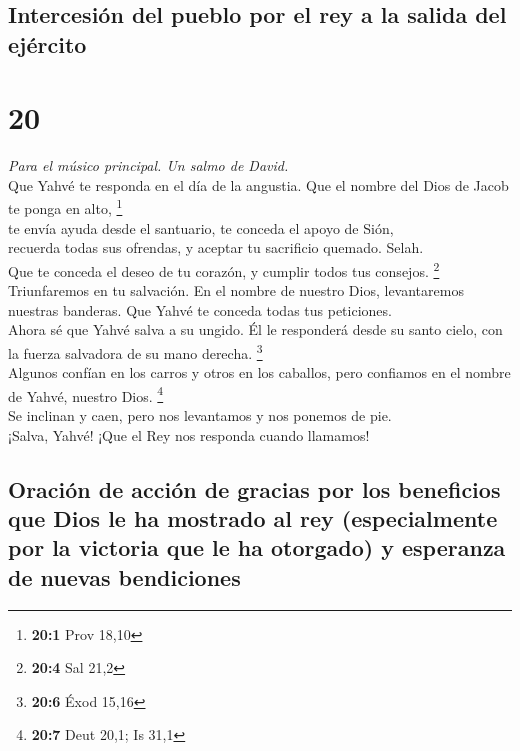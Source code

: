 \hypertarget{intercesiuxf3n-del-pueblo-por-el-rey-a-la-salida-del-ejuxe9rcito}{%
\subsection{Intercesión del pueblo por el rey a la salida del
ejército}\label{intercesiuxf3n-del-pueblo-por-el-rey-a-la-salida-del-ejuxe9rcito}}

\hypertarget{section-19}{%
\section{20}\label{section-19}}

\emph{Para el músico principal. Un salmo de David.}\\
 Que Yahvé te responda en el día de la angustia. Que el
nombre del Dios de Jacob te ponga en alto, \footnote{\textbf{20:1} Prov
  18,10}\\
 te envía ayuda desde el santuario, te conceda el apoyo de
Sión,\\
 recuerda todas sus ofrendas, y aceptar tu sacrificio
quemado. Selah.\\
 Que te conceda el deseo de tu corazón, y cumplir todos
tus consejos. \footnote{\textbf{20:4} Sal 21,2}\\
 Triunfaremos en tu salvación. En el nombre de nuestro
Dios, levantaremos nuestras banderas. Que Yahvé te conceda todas tus
peticiones.\\
 Ahora sé que Yahvé salva a su ungido. Él le responderá
desde su santo cielo, con la fuerza salvadora de su mano derecha.
\footnote{\textbf{20:6} Éxod 15,16}\\
 Algunos confían en los carros y otros en los caballos,
pero confiamos en el nombre de Yahvé, nuestro Dios. \footnote{\textbf{20:7}
  Deut 20,1; Is 31,1}\\
 Se inclinan y caen, pero nos levantamos y nos ponemos de
pie.\\
 ¡Salva, Yahvé! ¡Que el Rey nos responda cuando llamamos!

\hypertarget{oraciuxf3n-de-acciuxf3n-de-gracias-por-los-beneficios-que-dios-le-ha-mostrado-al-rey-especialmente-por-la-victoria-que-le-ha-otorgado-y-esperanza-de-nuevas-bendiciones}{%
\subsection{Oración de acción de gracias por los beneficios que Dios le
ha mostrado al rey (especialmente por la victoria que le ha otorgado) y
esperanza de nuevas
bendiciones}\label{oraciuxf3n-de-acciuxf3n-de-gracias-por-los-beneficios-que-dios-le-ha-mostrado-al-rey-especialmente-por-la-victoria-que-le-ha-otorgado-y-esperanza-de-nuevas-bendiciones}}

